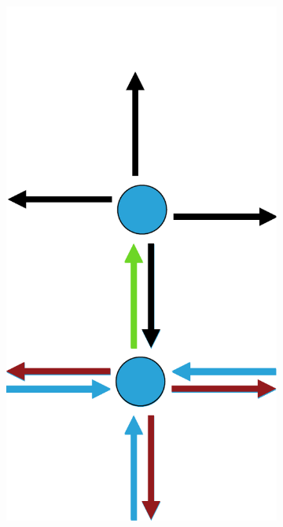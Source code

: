 \documentclass[12pt]{article}
\begin{document}
\begin{figure}[tb]
\begin{subfigure}[b]{0.15\textwidth}
      \includegraphics[width=\textwidth]{img/4}
      \caption{}\label{fig:contraction_kernel_greedy4}
  \end{subfigure}~%
  \begin{subfigure}[b]{0.15\textwidth}

\end{subfigure}
\end{figure}
\end{document}
